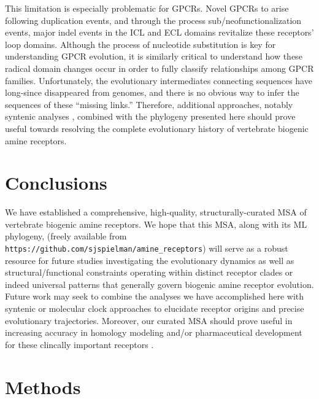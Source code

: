 \documentclass[fleqn,10pt]{wlpeerj}
\begin{document}
This limitation is especially problematic for GPCRs. Novel GPCRs to arise following duplication events, and through the process sub/neofunctionalization events, major indel events in the ICL and ECL domains revitalize these receptors' loop domains. Although the process of nucleotide substitution is key for understanding GPCR evolution, it is similarly critical to understand how these radical domain changes occur in order to fully classify relationships among GPCR families. Unfortunately, the evolutionary intermediates connecting sequences have long-since disappeared from genomes, and there is no obvious way to infer the sequences of these ``missing links.'' Therefore, additional approaches, notably syntenic analyses \citep{Sundstrom2010,Widmark2011,YegorovGood2012,Hwangetal2013}, combined with the phylogeny presented here should prove useful towards resolving the complete evolutionary history of vertebrate biogenic amine receptors. 

\section*{Conclusions}

We have established a comprehensive, high-quality, structurally-curated MSA of vertebrate biogenic amine receptors. We hope that this MSA, along with its ML phylogeny, (freely available from \texttt{https://github.com/sjspielman/amine\_receptors}) will serve as a robust resource for future studies investigating the evolutionary dynamics as well as structural/functional constraints operating within distinct receptor clades or indeed universal patterns that generally govern biogenic amine receptor evolution. Future work may seek to combine the analyses we have accomplished here with syntenic or molecular clock approaches to elucidate receptor origins and precise evolutionary trajectories. Moreover, our curated MSA should prove useful in increasing accuracy in homology modeling and/or pharmaceutical development for these clincally important receptors \citep{Kristiansen2004,Ishiguro2004,Eversetal2005,Masonetal2012}.




\section*{Methods}
\end{document}
